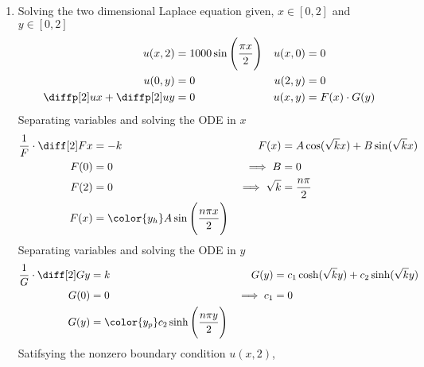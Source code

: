 \begin{enumerate}
    \item Solving the two dimensional Laplace equation given, $ x \in [0, 2] $ and
          $ y \in [0, 2] $
          \begin{align}
              u(x, 2)                    & = 1000 \sin\Bigg( \frac{\pi x}{2} \Bigg) &
              u(x, 0)                    & = 0                                        \\
              u(0, y)                    & = 0                                      &
              u(2, y)                    & = 0                                        \\
              \diffp[2] ux +\diffp[2] uy & = 0                                      &
              u(x, y)                    & = F(x) \cdot G(y)
          \end{align}
          Separating variables and solving the ODE in $ x $
          \begin{align}
              \frac{1}{F} \cdot \diff[2] Fx & = -k                                  &
              F(x)                          & = A\cos(\sqrt{k}x) + B\sin(\sqrt{k}x)   \\
              F(0)                          & = 0                                   &
              \implies B                    & = 0                                     \\
              F(2)                          & = 0                                   &
              \implies \sqrt{k}             & = \frac{n\pi}{2}                        \\
              F(x)                          & = \color{y_h} A\sin\Bigg(
              \frac{n\pi x}{2} \Bigg)
          \end{align}
          Separating variables and solving the ODE in $ y $
          \begin{align}
              \frac{1}{G} \cdot \diff[2] Gy & = k                           &
              G(y)                          & = c_1 \cosh(\sqrt{k}y)
              + c_2\sinh(\sqrt{k}y)                                           \\
              G(0)                          & = 0                           &
              \implies c_1                  & = 0                             \\
              G(y)                          & = \color{y_p} c_2 \sinh\Bigg(
              \frac{n\pi y}{2}\Bigg)
          \end{align}
          Satifsying the nonzero boundary condition $ u(x, 2) $,

\end{enumerate}
